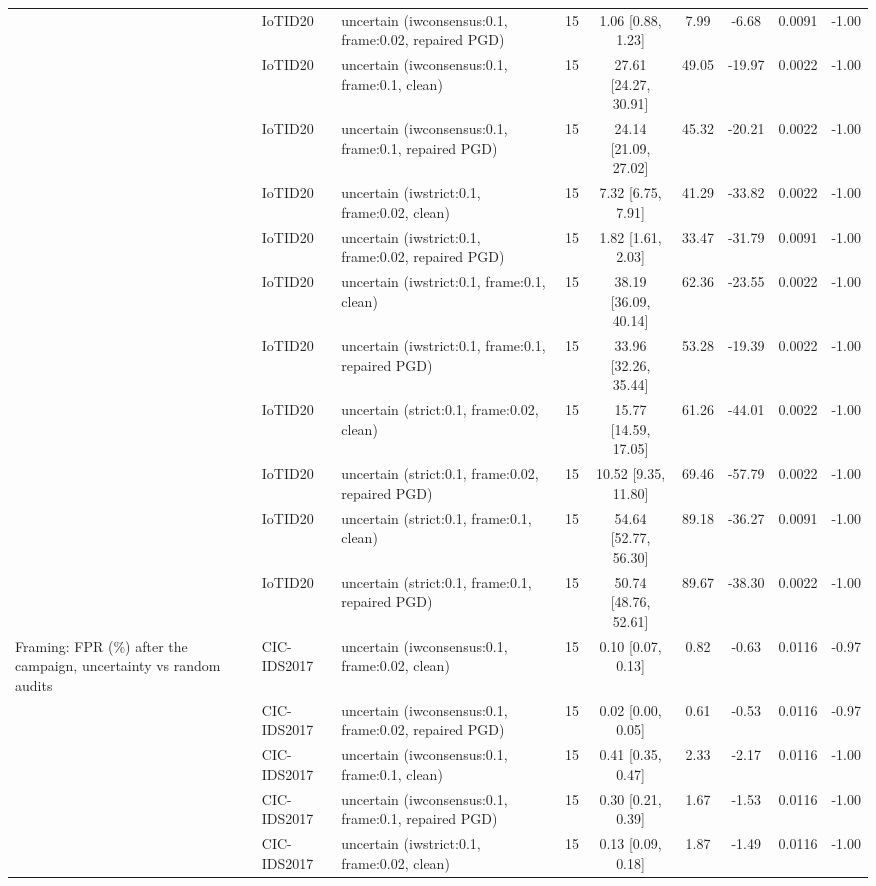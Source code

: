 \begin{table}[t]
\begin{tabular}{lllcccccc}
 & IoTID20 & uncertain (iwconsensus:0.1, frame:0.02, repaired PGD) & 15 & 1.06 [0.88, 1.23] & 7.99 & -6.68 & 0.0091 & -1.00 \\
 & IoTID20 & uncertain (iwconsensus:0.1, frame:0.1, clean) & 15 & 27.61 [24.27, 30.91] & 49.05 & -19.97 & 0.0022 & -1.00 \\
 & IoTID20 & uncertain (iwconsensus:0.1, frame:0.1, repaired PGD) & 15 & 24.14 [21.09, 27.02] & 45.32 & -20.21 & 0.0022 & -1.00 \\
 & IoTID20 & uncertain (iwstrict:0.1, frame:0.02, clean) & 15 & 7.32 [6.75, 7.91] & 41.29 & -33.82 & 0.0022 & -1.00 \\
 & IoTID20 & uncertain (iwstrict:0.1, frame:0.02, repaired PGD) & 15 & 1.82 [1.61, 2.03] & 33.47 & -31.79 & 0.0091 & -1.00 \\
 & IoTID20 & uncertain (iwstrict:0.1, frame:0.1, clean) & 15 & 38.19 [36.09, 40.14] & 62.36 & -23.55 & 0.0022 & -1.00 \\
 & IoTID20 & uncertain (iwstrict:0.1, frame:0.1, repaired PGD) & 15 & 33.96 [32.26, 35.44] & 53.28 & -19.39 & 0.0022 & -1.00 \\
 & IoTID20 & uncertain (strict:0.1, frame:0.02, clean) & 15 & 15.77 [14.59, 17.05] & 61.26 & -44.01 & 0.0022 & -1.00 \\
 & IoTID20 & uncertain (strict:0.1, frame:0.02, repaired PGD) & 15 & 10.52 [9.35, 11.80] & 69.46 & -57.79 & 0.0022 & -1.00 \\
 & IoTID20 & uncertain (strict:0.1, frame:0.1, clean) & 15 & 54.64 [52.77, 56.30] & 89.18 & -36.27 & 0.0091 & -1.00 \\
 & IoTID20 & uncertain (strict:0.1, frame:0.1, repaired PGD) & 15 & 50.74 [48.76, 52.61] & 89.67 & -38.30 & 0.0022 & -1.00 \\
Framing: FPR (\%) after the campaign, uncertainty vs random audits & CIC-IDS2017 & uncertain (iwconsensus:0.1, frame:0.02, clean) & 15 & 0.10 [0.07, 0.13] & 0.82 & -0.63 & 0.0116 & -0.97 \\
 & CIC-IDS2017 & uncertain (iwconsensus:0.1, frame:0.02, repaired PGD) & 15 & 0.02 [0.00, 0.05] & 0.61 & -0.53 & 0.0116 & -0.97 \\
 & CIC-IDS2017 & uncertain (iwconsensus:0.1, frame:0.1, clean) & 15 & 0.41 [0.35, 0.47] & 2.33 & -2.17 & 0.0116 & -1.00 \\
 & CIC-IDS2017 & uncertain (iwconsensus:0.1, frame:0.1, repaired PGD) & 15 & 0.30 [0.21, 0.39] & 1.67 & -1.53 & 0.0116 & -1.00 \\
 & CIC-IDS2017 & uncertain (iwstrict:0.1, frame:0.02, clean) & 15 & 0.13 [0.09, 0.18] & 1.87 & -1.49 & 0.0116 & -1.00 \\

\end{tabular}
\end{table}
